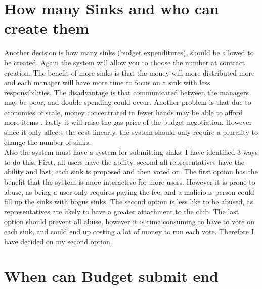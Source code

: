 \section{How many Sinks and who can create them}
Another decision is how many sinks (budget expenditures), should be allowed to be created. Again the system will allow you to choose the number at contract creation. The benefit of more sinks is that the money will more distributed more and each manager will have more time to focus on a sink with less responsibilities. The disadvantage is that communicated between the managers may be poor, and double spending could occur. Another problem is that due to economies of scale, money concentrated in fewer hands may be able to afford more items . lastly it will raise the gas price of the budget negotiation. However since it only affects the cost linearly, the system should only require a plurality to change the number of sinks.
\\
Also the system must have a system for submitting sinks. I have identified 3 ways to do this. First, all users have the ability, second all representatives have the ability and last, each sink is proposed and then voted on. The first option has the benefit that the system is more interactive for more users. However it is prone to abuse, as being a user only requires paying the fee, and a malicious person could fill up the sinks with bogus sinks.  The second option is less like to be abused, as representatives are likely to have a greater attachment to the club. The last option should prevent all abuse, however it is time consuming to have to vote on each sink, and could end up costing a lot of money to run each vote. Therefore I have decided on my second option.
\section{When can Budget submit end}

